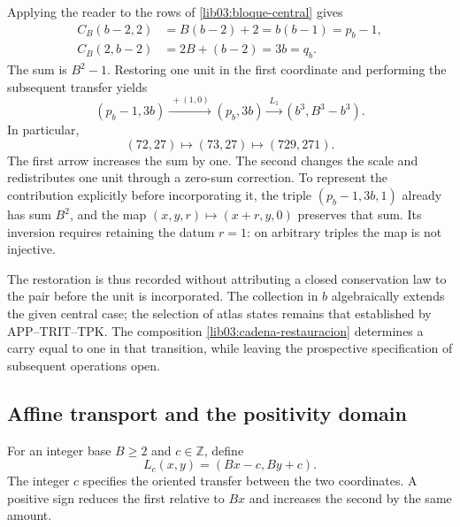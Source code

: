 Applying the reader to the rows of \eqref{lib03:bloque-central} gives
\begin{align}
 C_B(b-2,2)&=B(b-2)+2=b(b-1)=p_b-1,\\
 C_B(2,b-2)&=2B+(b-2)=3b=q_b.
 \label{lib03:concatenaciones}
\end{align}
The sum is \(B^2-1\). Restoring one unit in the first
coordinate and performing the subsequent transfer yields
\begin{equation}
 (p_b-1,3b)\xrightarrow{\ +(1,0)\ }(p_b,3b)
 \xrightarrow{\ L_1\ }(b^3,B^3-b^3).
 \label{lib03:cadena-restauracion}
\end{equation}
In particular,
\begin{equation}
 (72,27)\longmapsto(73,27)\longmapsto(729,271).
 \label{lib03:cadena-central}
\end{equation}
The first arrow increases the sum by one. The second changes the scale
and redistributes one unit through a zero-sum correction. To represent
the contribution explicitly before incorporating it, the triple
\((p_b-1,3b,1)\) already has sum \(B^2\), and the map
\((x,y,r)\mapsto(x+r,y,0)\) preserves that sum. Its inversion requires
retaining the datum \(r=1\): on arbitrary triples the map is not
injective.

The restoration is thus recorded without attributing a closed
conservation law to the pair before the unit is incorporated. The collection in \(b\)
algebraically extends the given central case; the selection of
atlas states remains that established by APP--TRIT--TPK.
The composition \eqref{lib03:cadena-restauracion} determines a carry
equal to one in that transition, while leaving the prospective specification
of subsequent operations open.

\subsection{Affine transport and the positivity domain}
\label{lib03:afin}

\begin{definition}
\label{lib03:def-transporte}
For an integer base \(B\geq2\) and \(c\in\mathbb Z\), define
\begin{equation}
 L_c(x,y)=(Bx-c,By+c).
 \label{lib03:lc}
\end{equation}
The integer \(c\) specifies the oriented transfer between the two
coordinates. A positive sign reduces the first relative to \(Bx\)
and increases the second by the same amount.
\end{definition}


